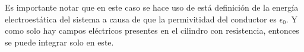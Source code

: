\begin{solucion}{3}
Es importante notar que en este caso se hace uso de está definición de la energía electroestática del sistema a causa de que la permivitidad del conductor es $\epsilon_0$. Y como solo hay campos eléctricos presentes en el cilindro con resistencia, entonces se puede integrar solo en este.


\end{solucion}

\bigbreak

